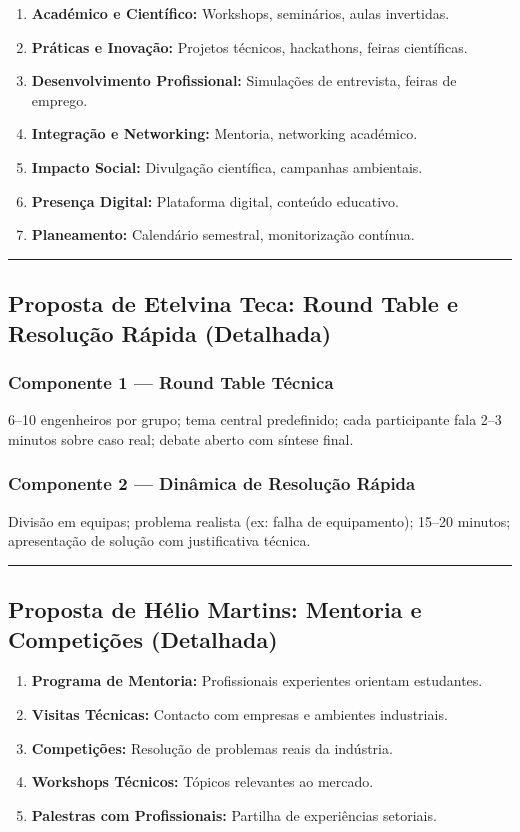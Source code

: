 \documentclass[12pt,a4paper]{article}
\newcommand{\proposalsep}{%
  \vspace{6pt}%
  {\color{gold}\rule{0.35\linewidth}{0.7pt}}%
  \vspace{4pt}%
}
\begin{document}
\begin{enumerate}
    \item \textbf{Académico e Científico:} Workshops, seminários, aulas invertidas.
    \item \textbf{Práticas e Inovação:} Projetos técnicos, hackathons, feiras científicas.
    \item \textbf{Desenvolvimento Profissional:} Simulações de entrevista, feiras de emprego.
    \item \textbf{Integração e Networking:} Mentoria, networking académico.
    \item \textbf{Impacto Social:} Divulgação científica, campanhas ambientais.
    \item \textbf{Presença Digital:} Plataforma digital, conteúdo educativo.
    \item \textbf{Planeamento:} Calendário semestral, monitorização contínua.
\end{enumerate}

\proposalsep

\subsection{Proposta de Etelvina Teca: Round Table e Resolução Rápida (Detalhada)}

\subsubsection*{Componente 1 — Round Table Técnica}
6–10 engenheiros por grupo; tema central predefinido; cada participante fala 2–3 minutos sobre caso real; debate aberto com síntese final.

\subsubsection*{Componente 2 — Dinâmica de Resolução Rápida}
Divisão em equipas; problema realista (ex: falha de equipamento); 15–20 minutos; apresentação de solução com justificativa técnica.

\proposalsep

\subsection{Proposta de Hélio Martins: Mentoria e Competições (Detalhada)}

\begin{enumerate}
    \item \textbf{Programa de Mentoria:} Profissionais experientes orientam estudantes.
    \item \textbf{Visitas Técnicas:} Contacto com empresas e ambientes industriais.
    \item \textbf{Competições:} Resolução de problemas reais da indústria.
    \item \textbf{Workshops Técnicos:} Tópicos relevantes ao mercado.
    \item \textbf{Palestras com Profissionais:} Partilha de experiências setoriais.
\end{enumerate}
\end{document}
